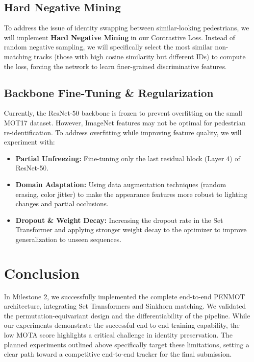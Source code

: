 \documentclass{article}
\begin{document}
\subsection{Hard Negative Mining}

To address the issue of identity swapping between similar-looking pedestrians, we will implement \textbf{Hard Negative Mining} in our Contrastive Loss. Instead of random negative sampling, we will specifically select the most similar non-matching tracks (those with high cosine similarity but different IDs) to compute the loss, forcing the network to learn finer-grained discriminative features.

\subsection{Backbone Fine-Tuning & Regularization}

Currently, the ResNet-50 backbone is frozen to prevent overfitting on the small MOT17 dataset. However, ImageNet features may not be optimal for pedestrian re-identification. To address overfitting while improving feature quality, we will experiment with:
\begin{itemize}
  \item \textbf{Partial Unfreezing:} Fine-tuning only the last residual block (Layer 4) of ResNet-50.
  \item \textbf{Domain Adaptation:} Using data augmentation techniques (random erasing, color jitter) to make the appearance features more robust to lighting changes and partial occlusions.
  \item \textbf{Dropout & Weight Decay:} Increasing the dropout rate in the Set Transformer and applying stronger weight decay to the optimizer to improve generalization to unseen sequences.
\end{itemize}

\section{Conclusion}

In Milestone 2, we successfully implemented the complete end-to-end PENMOT architecture, integrating Set Transformers and Sinkhorn matching. We validated the permutation-equivariant design and the differentiability of the pipeline. While our experiments demonstrate the successful end-to-end training capability, the low MOTA score highlights a critical challenge in identity preservation. The planned experiments outlined above specifically target these limitations, setting a clear path toward a competitive end-to-end tracker for the final submission.
\end{document}
